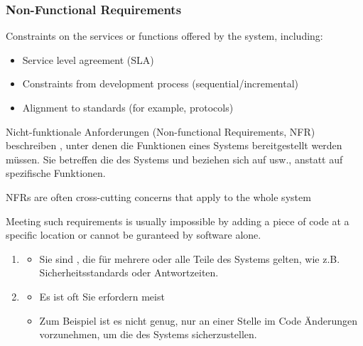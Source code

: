 \subsubsection{Non-Functional Requirements}
\begin{defBox}[title=Non-functional Requirements (NFR)]
    Constraints on the services or functions offered by the system, including:
    \begin{itemize}
        \item Service level agreement (SLA)
        \item Constraints from development process (sequential/incremental)
        \item Alignment to standards (for example, protocols)
    \end{itemize}
\end{defBox}
\begin{infoBox}
    Nicht-funktionale Anforderungen (Non-functional Requirements, NFR) beschreiben , unter denen die Funktionen eines Systems bereitgestellt werden müssen. Sie betreffen die  des Systems und beziehen sich auf  usw., anstatt auf spezifische Funktionen.
\end{infoBox}
\begin{defBox}
    NFRs are often cross-cutting concerns that apply to the whole system
\end{defBox}
Meeting such requirements is usually impossible by adding a piece of code at a specific location or cannot be guranteed by software alone.
\begin{infoBox}[title=Merkmale nicht-funktionaler Anforderungen]
    \begin{enumerate}
        \item {}
        \begin{itemize}
            \item Sie sind , die für mehrere oder alle Teile des Systems gelten, wie z.B. Sicherheitsstandards oder Antwortzeiten.
        \end{itemize}
        \item {}
        \begin{itemize}
            \item Es ist oft  Sie erfordern meist 
            \item Zum Beispiel ist es nicht genug, nur an einer Stelle im Code Änderungen vorzunehmen, um die  des Systems sicherzustellen.
        \end{itemize}
    \end{enumerate}
\end{infoBox}

